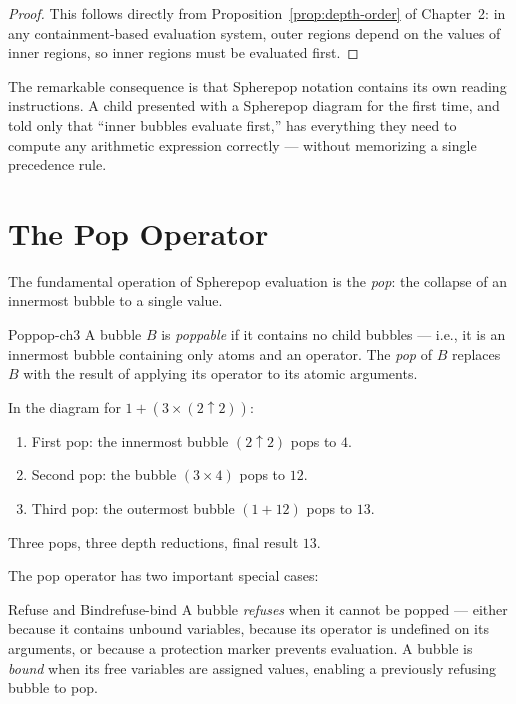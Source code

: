 \begin{proof}
  This follows directly from Proposition~\ref{prop:depth-order} of
  Chapter~2: in any containment-based evaluation system, outer regions
  depend on the values of inner regions, so inner regions must be
  evaluated first.
\end{proof}

The remarkable consequence is that Spherepop notation contains its own
reading instructions. A child presented with a Spherepop diagram for
the first time, and told only that ``inner bubbles evaluate first,'' has
everything they need to compute any arithmetic expression correctly —
without memorizing a single precedence rule.

\section{The Pop Operator}

The fundamental operation of Spherepop evaluation is the \emph{pop}: the
collapse of an innermost bubble to a single value.

\begin{definition}{Pop}{pop-ch3}
  A bubble $B$ is \emph{poppable} if it contains no child bubbles —
  i.e., it is an innermost bubble containing only atoms and an operator.
  The \emph{pop} of $B$ replaces $B$ with the result of applying its
  operator to its atomic arguments.
\end{definition}

\begin{example}
  In the diagram for $1 + (3 \times (2 \uparrow 2))$:
  \begin{enumerate}
    \item First pop: the innermost bubble $(2 \uparrow 2)$ pops to $4$.
    \item Second pop: the bubble $(3 \times 4)$ pops to $12$.
    \item Third pop: the outermost bubble $(1 + 12)$ pops to $13$.
  \end{enumerate}
  Three pops, three depth reductions, final result $13$.
\end{example}

The pop operator has two important special cases:

\begin{definition}{Refuse and Bind}{refuse-bind}
  A bubble \emph{refuses} when it cannot be popped — either because
  it contains unbound variables, because its operator is undefined on
  its arguments, or because a protection marker prevents evaluation.
  A bubble is \emph{bound} when its free variables are assigned values,
  enabling a previously refusing bubble to pop.
\end{definition}

